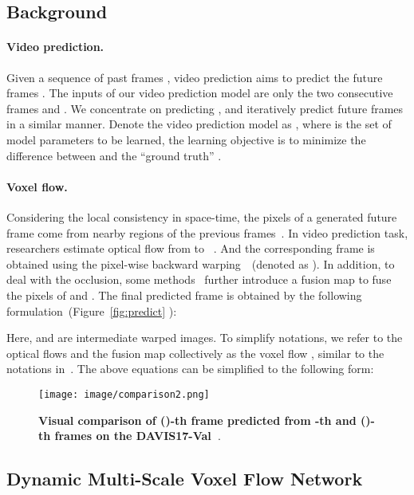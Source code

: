 \documentclass[10pt,twocolumn,letterpaper]{article}
\begin{document}
\subsection{Background}
\label{sec:background}

\paragraph{Video prediction.}
Given a sequence of past  frames , video prediction aims to predict the future frames . The inputs of our video prediction model are only the two consecutive frames  and . We concentrate on predicting , and iteratively predict future frames  in a similar manner. Denote the video prediction model as , where  is the set of model parameters to be learned, the learning objective is to minimize the difference between  and the ``ground truth'' .

\paragraph{Voxel flow.} Considering the local consistency in space-time, the pixels of a generated future frame come from nearby regions of the previous frames~\cite{zhou2016view,vimeo}. In video prediction task, researchers estimate optical flow  from  to ~\cite{dvf}. And the corresponding frame is obtained using the pixel-wise backward warping~\cite{backwarp}~(denoted as ). In addition, to deal with the occlusion, some methods~\cite{superslomo,dvf} further introduce a fusion map  to fuse the pixels of  and . The final predicted frame is obtained by the following formulation~(Figure~\ref{fig:predict} ):



Here,  and  are intermediate warped images. To simplify notations, we refer to the optical flows  and the fusion map  collectively as the voxel flow , similar to the notations in~\cite{dvf}. The above equations can be simplified to the following form:


\begin{figure*}[htbp]
	\centering
	\texttt{[image: image/comparison2.png]}
	\caption{\textbf{Visual comparison of ()-th frame predicted from -th and ()-th frames on the DAVIS17-Val~\cite{davis}}.}
	\label{fig:davis17}
 \vspace{-1em}
\end{figure*}

\subsection{Dynamic Multi-Scale Voxel Flow Network}
\label{sec:dmvfn}
\end{document}

